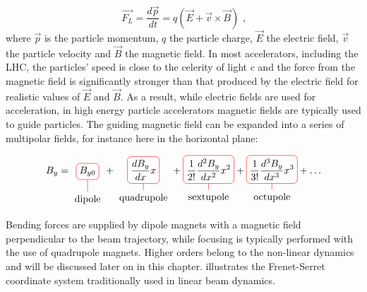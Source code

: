 \begin{equation}
    \vec{F_L} = \dfrac{d\vec{p}}{dt} = q (\vec{E} + \vec{v} \times \vec{B}) \text{ ,}
    \label{equation:lorentz_force}
\end{equation}
where \(\vec{p}\) is the particle momentum, \(q\) the particle charge, \(\vec{E}\) the electric field, \(\vec{v}\) the particle velocity and \(\vec{B}\) the magnetic field.
In most accelerators, including the \gls{LHC}, the particles' speed is close to the celerity of light \(c\) and the force from the magnetic field is significantly stronger than that produced by the electric field for realistic values of \(\vec{E}\) and \(\vec{B}\).
As a result, while electric fields are used for acceleration, in high energy particle accelerators magnetic fields are typically used to guide particles.
The guiding magnetic field can be expanded into a series of multipolar fields, for instance here in the horizontal plane:

\begin{align}
    B_{y} = 
    \tikz[baseline]{
        \node[draw=red,rounded corners,anchor=base] (m1)
        {\(\displaystyle B_{y0}\)};
        \node[below of=m1] (l1) {dipole};
        \draw[-,red] (l1) -- (m1);
    }
    +
    \tikz[baseline]{
        \node[draw=red,rounded corners,anchor=base] (m2)
        {\(\displaystyle \frac{dB_{y}}{dx} x\)};
        \node[below of=m2] (l2) {quadrupole};
        \draw[-,red] (l2) -- (m2);
    }
    +
    \tikz[baseline]{
        \node[draw=red,rounded corners,anchor=base] (m3)
        {\(\displaystyle \frac{1}{2!} \frac{d^2B_{y}}{dx^2} x^2\)};
        \node[below of=m3] (l2) {sextupole};
        \draw[-,red] (l2) -- (m3);
    }
    +
    \tikz[baseline]{
        \node[draw=red,rounded corners,anchor=base] (m4)
        {\(\displaystyle \frac{1}{3!} \frac{d^3B_{y}}{dx^3} x^3\)};
        \node[below of=m4] (l2) {octupole};
        \draw[-,red] (l2) -- (m4);
    }
    + \ldots
    \label{equation:magnetic_field_expansion}
\end{align}

Bending forces are supplied by dipole magnets with a magnetic field perpendicular to the beam trajectory, while focusing is typically performed with the use of quadrupole magnets.
Higher orders belong to the non-linear dynamics and will be discussed later on in this chapter.
 illustrates the Frenet-Serret coordinate system traditionally used in linear beam dynamics.

